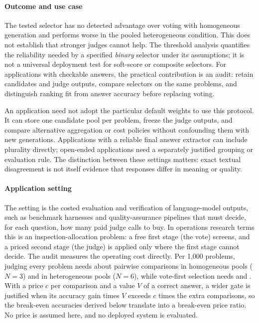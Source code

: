 \documentclass[preprint,11pt,number,sort&compress]{elsarticle}
\begin{document}
\paragraph{Outcome and use case}
\label{sec:outcome}
The tested selector has no detected advantage over voting with homogeneous
generation and performs worse in the pooled heterogeneous condition.
This does not establish that stronger judges cannot help. The threshold
analysis quantifies the reliability needed by a specified \emph{binary}
selector under its assumptions; it is not a universal deployment test for
soft-score or composite selectors. For applications with checkable answers,
the practical contribution is an audit: retain candidates and judge outputs,
compare selectors on the same problems, and distinguish ranking fit from
answer accuracy before replacing voting.

An application need not adopt the particular default weights to use this
protocol. It can store one candidate pool per problem, freeze the judge
outputs, and compare alternative aggregation or cost policies without
confounding them with new generations. Applications with a reliable final
answer extractor can include plurality directly; open-ended applications
need a separately justified grouping or evaluation rule. The distinction
between these settings matters: exact textual disagreement is not itself
evidence that responses differ in meaning or quality.

\paragraph{Application setting}
The setting is the costed evaluation and verification of language-model outputs, such as benchmark
harnesses and quality-assurance pipelines that must decide, for each question, how many paid judge
calls to buy. In operations research terms this is an inspection-allocation problem: a free first
stage (the vote) screens, and a priced second stage (the judge) is applied only where the first stage
cannot decide. The audit measures the operating cost directly. Per 1{,}000 problems, judging every
problem needs about \HybHomCallsCPerK{} pairwise comparisons in homogeneous pools ($N=3$) and
\HybHetCallsCPerK{} in heterogeneous pools ($N=6$), while vote-first selection needs
\HybHomCallsHPerK{} and \HybHetCallsHPerK{}. With a price $c$ per comparison and a value $V$ of a
correct answer, a wider gate is justified when its accuracy gain times $V$ exceeds $c$ times the extra
comparisons, so the break-even accuracies derived below translate into a break-even price ratio. No
price is assumed here, and no deployed system is evaluated.
\end{document}
